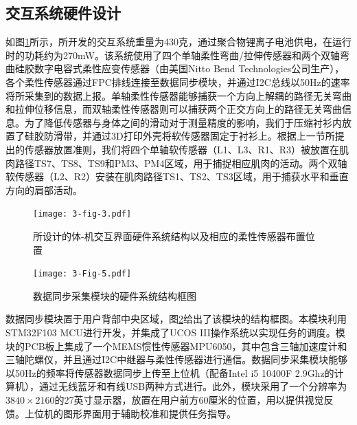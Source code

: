 \subsection{交互系统硬件设计}如图\ref{3-fig-3}所示，所开发的交互系统重量为430克，通过聚合物锂离子电池供电，在运行时的功耗约为270mW。该系统使用了四个单轴柔性弯曲/拉伸传感器和两个双轴弯曲硅胶数字电容式柔性应变传感器（由美国Nitto Bend Technologies公司生产），各个柔性传感器通过FPC排线连接至数据同步模块，并通过I2C总线以50Hz的速率将所采集到的数据上报。单轴柔性传感器能够捕获一个方向上解耦的路径无关弯曲和拉伸位移信息，而双轴柔性传感器则可以捕获两个正交方向上的路径无关弯曲信息。为了降低传感器与身体之间的滑动对于测量精度的影响，我们于压缩衬衫内放置了硅胶防滑带，并通过3D打印外壳将软传感器固定于衬衫上。根据上一节所提出的传感器放置准则，我们将四个单轴软传感器（L1、L3、R1、R3）被放置在肌肉路径TS7、TS8、TS9和PM3、PM4区域，用于捕捉相应肌肉的活动。两个双轴软传感器（L2、R2）安装在肌肉路径TS1、TS2、TS3区域，用于捕获水平和垂直方向的肩部活动。

\begin{figure}[htb]
    \centering
    \texttt{[image: 3-fig-3.pdf]}
    \caption{所设计的体-机交互界面硬件系统结构以及相应的柔性传感器布置位置}
    \label{3-fig-3}
\end{figure}     

\begin{figure}[htb]
    \centering
    \texttt{[image: 3-Fig-5.pdf]}
    \caption{数据同步采集模块的硬件系统结构框图}
    \label{3-fig-5}
\end{figure} 
数据同步模块置于用户背部中央区域，图\ref{3-fig-5}给出了该模块的结构框图。本模块利用STM32F103 MCU进行开发，并集成了UCOS III操作系统以实现任务的调度。模块的PCB板上集成了一个MEMS惯性传感器MPU6050，其中包含三轴加速度计和三轴陀螺仪，并且通过I2C中继器与柔性传感器进行通信。数据同步采集模块能够以50Hz的频率将传感器数据同步上传至上位机（配备Intel i5 10400F 2.9Ghz的计算机），通过无线蓝牙和有线USB两种方式进行。此外，模块采用了一个分辨率为$3840\times2160$的27英寸显示器，放置在用户前方60厘米的位置，用以提供视觉反馈。上位机的图形界面用于辅助校准和提供任务指导。


